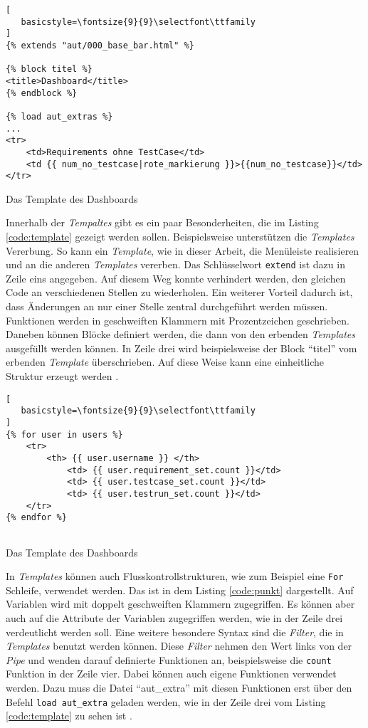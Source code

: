 \documentclass[11pt,a4paper]{report}
\begin{document}
\begin{listing}[htbp]
\begin{lstlisting}[
   basicstyle=\fontsize{9}{9}\selectfont\ttfamily
]
{% extends "aut/000_base_bar.html" %}

{% block titel %}
<title>Dashboard</title>
{% endblock %}

{% load aut_extras %}
...
<tr>
	<td>Requirements ohne TestCase</td>
    <td {{ num_no_testcase|rote_markierung }}>{{num_no_testcase}}</td>
</tr>
\end{lstlisting}
\caption{Das Template des Dashboards}
\label{code:template}
\end{listing}


Innerhalb der \textit{Tempaltes} gibt es ein paar Besonderheiten, die im Listing \ref{code:template} gezeigt werden sollen. Beispielsweise unterstützen die \textit{Templates} Vererbung. So kann ein \textit{Template}, wie in dieser Arbeit, die Menüleiste realisieren und an die anderen \textit{Templates} vererben. Das Schlüsselwort \verb|extend| ist dazu in Zeile eins angegeben. Auf diesem Weg konnte verhindert werden, den gleichen Code an verschiedenen Stellen zu wiederholen. Ein weiterer Vorteil dadurch ist, dass Änderungen an nur einer Stelle zentral durchgeführt werden müssen. Funktionen werden in geschweiften Klammern mit Prozentzeichen geschrieben. Daneben können Blöcke definiert werden, die dann von den erbenden \textit{Templates} ausgefüllt werden können. In Zeile drei wird beispielsweise der Block "`titel"' vom erbenden \textit{Template} überschrieben. Auf diese Weise kann eine einheitliche Struktur erzeugt werden \cite{djangotuto1}.


\begin{listing}[htbp]
\begin{lstlisting}[
   basicstyle=\fontsize{9}{9}\selectfont\ttfamily
]
{% for user in users %}
	<tr>
    	<th> {{ user.username }} </th>
        	<td> {{ user.requirement_set.count }}</td>
            <td> {{ user.testcase_set.count }}</td>
            <td> {{ user.testrun_set.count }}</td>
	</tr>
{% endfor %}
       
\end{lstlisting}
\caption{Das Template des Dashboards}
\label{code:punkt}
\end{listing}

In \textit{Templates} können auch Flusskontrollstrukturen, wie zum Beispiel eine \verb|For| Schleife, verwendet werden. Das ist in dem Listing \ref{code:punkt} dargestellt. Auf Variablen wird mit doppelt geschweiften Klammern zugegriffen. Es können aber auch auf die Attribute der Variablen zugegriffen werden, wie in der Zeile drei verdeutlicht werden soll. Eine weitere besondere Syntax sind die \textit{Filter}, die in \textit{Templates} benutzt werden können. Diese \textit{Filter} nehmen den Wert links von der \textit{Pipe} und wenden darauf definierte Funktionen an, beispielsweise die \verb|count| Funktion in der Zeile vier. Dabei können auch eigene Funktionen verwendet werden. Dazu muss die Datei "`aut\_extra"' mit diesen Funktionen erst über den Befehl \verb|load aut_extra| geladen werden, wie in der Zeile drei vom Listing \ref{code:template} zu sehen ist \cite{djangotuto1}.
\end{document}
